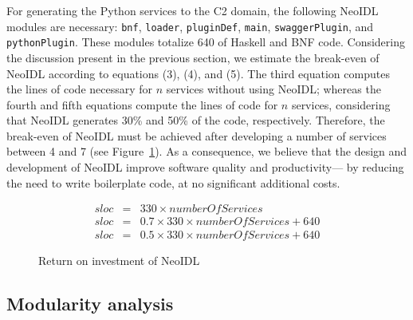 \documentclass{ws-ijseke}
\newcommand{\neoidl}{NeoIDL}
\begin{document}
For generating the Python services to the C2 domain,
the following \neoidl{} modules are necessary:
\texttt{bnf}, \texttt{loader}, \texttt{pluginDef}, \texttt{main}, 
\texttt{swaggerPlugin}, and \texttt{pythonPlugin}. These modules
totalize 640 of Haskell and BNF code.
Considering the discussion present in the previous section, 
we estimate the break-even of \neoidl{}
according to equations (3), (4), and (5). The third equation
computes the lines of code necessary for $n$ services without 
using \neoidl; whereas the fourth and fifth equations compute 
the lines of code for $n$ services, considering that \neoidl{} 
generates 30\% and 50\% of the code, respectively.  Therefore, the
break-even of \neoidl{} must be achieved after developing a number 
of services between 4 and 7 (see Figure~\ref{fig:roi}). As a consequence, we believe that 
the design and development of \neoidl{} improve software 
quality and productivity--- by reducing the need to 
write boilerplate code, at no significant additional costs.

\begin{small}
\begin{eqnarray}
sloc & = & 330 \times numberOfServices \\
sloc & = & 0.7 \times 330 \times numberOfServices + 640 \\
sloc & = & 0.5 \times 330 \times numberOfServices + 640 
\end{eqnarray}
\end{small}

\begin{figure}[thb]
\begin{center}
\vspace{-1cm}
\end{center}
\caption{Return on investment of \neoidl}
\label{fig:roi}
\end{figure}

\vspace{-1cm}
\subsection{Modularity analysis}\label{sub:modularity}
\end{document}
